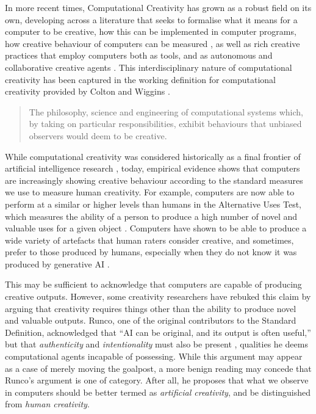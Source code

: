 In more recent times, Computational Creativity has grown as a robust field on its own, developing across a literature that seeks to formalise what it means for a computer to be creative, how this can be implemented in computer programs, how creative behaviour of computers can be measured \cite{Ritchie2007-jy, Colton2008-fh, Colton2011-uy, Maher2012-oj, Jordanous2012-kw}, as well as rich creative practices that employ computers both as tools, and as autonomous and collaborative creative agents \cite{Cohen1995-wt, Colton2015-qr, Perez-y-Perez1999-ma, Cope1992-pq, Reichardt1968-eo}. This interdisciplinary nature of computational creativity has been captured in the working definition for computational creativity provided by Colton and Wiggins \cite{Colton2021-bt}.

\begin{quote}
The philosophy, science and engineering of computational systems which, by taking on particular responsibilities, exhibit behaviours that unbiased observers would deem to be creative.
\end{quote}

While computational creativity was considered historically as a final frontier of artificial intelligence research \cite{Colton2021-bt}, today, empirical evidence shows that computers are increasingly showing creative behaviour according to the standard measures we use to measure human creativity. For example, computers are now able to perform at a similar or higher levels than humans in the Alternative Uses Test, which measures the ability of a person to produce a high number of novel and valuable uses for a given object \cite{Hubert2024-kv, Guzik2023-cl}. Computers have shown to be able to produce a wide variety of artefacts that human raters consider creative, and sometimes, prefer to those produced by humans, especially when they do not know it was produced by generative AI \cite{Alexander2024-pz, Wu2025-or, Kobis2021-bb}. 

This may be sufficient to acknowledge that computers are capable of producing creative outputs. However, some creativity researchers have rebuked this claim by arguing that creativity requires things other than the ability to produce novel and valuable outputs. Runco, one of the original contributors to the Standard Definition, acknowledged that “AI can be original, and its output is often useful,” but that \emph{authenticity} and \emph{intentionality} must also be present \cite{Runco2025-bu}, qualities he deems computational agents incapable of possessing. While this argument may appear as a case of merely moving the goalpost, a more benign reading may concede that Runco's argument is one of category. After all, he proposes that what we observe in computers should be better termed as \textit{artificial creativity}, and be distinguished from \textit{human creativity}. 

